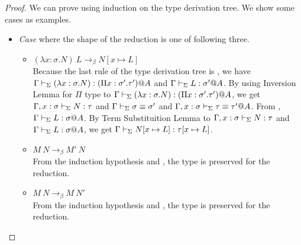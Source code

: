 \begin{proof}
	We can prove using induction on the type derivation tree.
	We show some cases as examples.
	\begin{itemize}
		\newcommand{\LB}{\longrightarrow_{\beta}}
																
		\item \textit{Case} \TApp{} where the shape of the reduction is one of following three.
		      \begin{itemize}
		      	\item $(\lambda x:\sigma.N)\ L \LB N[x\mapsto L]$\\
		      	      Because the last rule of the type derivation tree is \TApp, 
		      	      we have $\Gamma \vdash_\Sigma (\lambda x:\sigma.N) : (\Pi x:\sigma'.\tau')@A$ and
		      	      $\Gamma \vdash_\Sigma L:\sigma' @A$.
		      	      By using Inversion Lemma for $\Pi$ type to $\Gamma \vdash_\Sigma (\lambda x:\sigma.N) : (\Pi x:\sigma'.\tau')@A$,
		      	      we get $\Gamma, x:\sigma \vdash_\Sigma N:\tau$ and $\Gamma \vdash_\Sigma \sigma \equiv \sigma'$ and $\Gamma ,x:\sigma \vdash_\Sigma \tau \equiv \tau'@A$.
		      	      From \TConv , $\Gamma \vdash_\Sigma L:\sigma @A$.
		      	      By Term Substituition Lemma to $\Gamma, x:\sigma \vdash_\Sigma N:\tau$ and $\Gamma \vdash_\Sigma L:\sigma @A$, 
		      	      we get $\Gamma \vdash_\Sigma N[x\mapsto L]:\tau[x\mapsto L]$.
		      	      		      	      	      	      	      	      	      	      	      	      	      	      	      	      		      	      	      	      	      	      	      	      	      	      
		      	\item $M\ N \LB M'\ N$\\
		      	      From the induction hypothesis and \TApp, the type is preserved for the reduction.
		      	\item $M\ N \LB M\ N'$\\
		      	      From the induction hypothesis and \TApp, the type is preserved for the reduction.
		      \end{itemize}
		      		      	      	      	      	      	      	      		      	      	      	      	      
		      		      	      	      	      	      	      	      		      	      	      	      	      
		      		      	      	      	      	      	      	      		      	      	      	      	      
		      		      	      	      	      	      	      	      		      	      	      	      	      

\end{itemize}
\end{proof}
